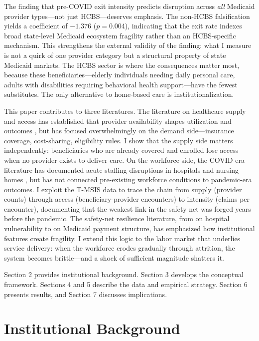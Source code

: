\documentclass[12pt]{article}
\begin{document}
The finding that pre-COVID exit intensity predicts disruption across \emph{all} Medicaid provider types---not just HCBS---deserves emphasis. The non-HCBS falsification yields a coefficient of $-1.376$ ($p = 0.004$), indicating that the exit rate indexes broad state-level Medicaid ecosystem fragility rather than an HCBS-specific mechanism. This strengthens the external validity of the finding: what I measure is not a quirk of one provider category but a structural property of state Medicaid markets. The HCBS sector is where the consequences matter most, because these beneficiaries---elderly individuals needing daily personal care, adults with disabilities requiring behavioral health support---have the fewest substitutes. The only alternative to home-based care is institutionalization.

This paper contributes to three literatures. The literature on healthcare supply and access has established that provider availability shapes utilization and outcomes \citep{finkelstein2012,baicker2013}, but has focused overwhelmingly on the demand side---insurance coverage, cost-sharing, eligibility rules. I show that the supply side matters independently: beneficiaries who are already covered and enrolled lose access when no provider exists to deliver care. On the workforce side, the COVID-era literature has documented acute staffing disruptions in hospitals \citep{sinsky2021covid} and nursing homes \citep{alexander2020}, but has not connected pre-existing workforce conditions to pandemic-era outcomes. I exploit the T-MSIS data to trace the chain from supply (provider counts) through access (beneficiary-provider encounters) to intensity (claims per encounter), documenting that the weakest link in the safety net was forged years before the pandemic. The safety-net resilience literature, from \citet{dranove2000} on hospital vulnerability to \citet{duggan2000} on Medicaid payment structure, has emphasized how institutional features create fragility. I extend this logic to the labor market that underlies service delivery: when the workforce erodes gradually through attrition, the system becomes brittle---and a shock of sufficient magnitude shatters it.

Section 2 provides institutional background. Section 3 develops the conceptual framework. Sections 4 and 5 describe the data and empirical strategy. Section 6 presents results, and Section 7 discusses implications.


\section{Institutional Background}
\end{document}
